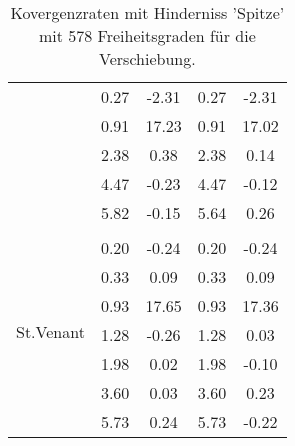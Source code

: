 \begin{table}
\begin{tabular}{c|cc|cc|}
\multicolumn{1}{|c|}{} & \multicolumn{1}{|c|}{      0.27} & \multicolumn{1}{|c|}{     -2.31} & \multicolumn{1}{|c|}{      0.27} & \multicolumn{1}{|c|}{     -2.31} \\ 
\multicolumn{1}{|c|}{} & \multicolumn{1}{|c|}{      0.91} & \multicolumn{1}{|c|}{     17.23} & \multicolumn{1}{|c|}{      0.91} & \multicolumn{1}{|c|}{     17.02} \\ 
\multicolumn{1}{|c|}{} & \multicolumn{1}{|c|}{      2.38} & \multicolumn{1}{|c|}{      0.38} & \multicolumn{1}{|c|}{      2.38} & \multicolumn{1}{|c|}{      0.14} \\ 
\multicolumn{1}{|c|}{} & \multicolumn{1}{|c|}{      4.47} & \multicolumn{1}{|c|}{     -0.23} & \multicolumn{1}{|c|}{      4.47} & \multicolumn{1}{|c|}{     -0.12} \\ 
\multicolumn{1}{|c|}{} & \multicolumn{1}{|c|}{      5.82} & \multicolumn{1}{|c|}{     -0.15} & \multicolumn{1}{|c|}{      5.64} & \multicolumn{1}{|c|}{      0.26} \\ 
\hline 
\multicolumn{1}{|c|}{\multirow{8}{*}{St.Venant}} &\multicolumn{1}{|c|}{} & \multicolumn{1}{|c|}{} & \multicolumn{1}{|c|}{} & \multicolumn{1}{|c|}{} \\ 
\multicolumn{1}{|c|}{} & \multicolumn{1}{|c|}{      0.20} & \multicolumn{1}{|c|}{     -0.24} & \multicolumn{1}{|c|}{      0.20} & \multicolumn{1}{|c|}{     -0.24} \\ 
\multicolumn{1}{|c|}{} & \multicolumn{1}{|c|}{      0.33} & \multicolumn{1}{|c|}{      0.09} & \multicolumn{1}{|c|}{      0.33} & \multicolumn{1}{|c|}{      0.09} \\ 
\multicolumn{1}{|c|}{} & \multicolumn{1}{|c|}{      0.93} & \multicolumn{1}{|c|}{     17.65} & \multicolumn{1}{|c|}{      0.93} & \multicolumn{1}{|c|}{     17.36} \\ 
\multicolumn{1}{|c|}{} & \multicolumn{1}{|c|}{      1.28} & \multicolumn{1}{|c|}{     -0.26} & \multicolumn{1}{|c|}{      1.28} & \multicolumn{1}{|c|}{      0.03} \\ 
\multicolumn{1}{|c|}{} & \multicolumn{1}{|c|}{      1.98} & \multicolumn{1}{|c|}{      0.02} & \multicolumn{1}{|c|}{      1.98} & \multicolumn{1}{|c|}{     -0.10} \\ 
\multicolumn{1}{|c|}{} & \multicolumn{1}{|c|}{      3.60} & \multicolumn{1}{|c|}{      0.03} & \multicolumn{1}{|c|}{      3.60} & \multicolumn{1}{|c|}{      0.23} \\ 
\multicolumn{1}{|c|}{} & \multicolumn{1}{|c|}{      5.73} & \multicolumn{1}{|c|}{      0.24} & \multicolumn{1}{|c|}{      5.73} & \multicolumn{1}{|c|}{     -0.22} \\ 
\hline 
\end{tabular}\caption{Kovergenzraten mit Hinderniss 'Spitze' mit 578 Freiheitsgraden für die Verschiebung.}\label{tab:Rate_Spitze_level3}
\end{table} 
